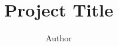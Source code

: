 \documentclass[11pt]{article}
\begin{document}
    \title{Project Title}
    \author{Author}
    \maketitle

    \tableofcontents


    


    
\end{document}
